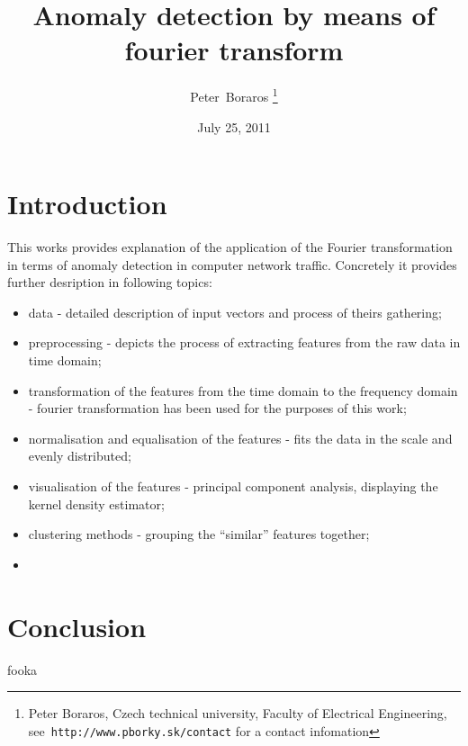 \documentclass[a4paper]{IEEEtran}
\begin{document}
\title{Anomaly detection by means of fourier transform}
\date{July 25, 2011}
\author{Peter~Boraros %
\thanks{{Peter Boraros}, Czech technical university, Faculty of Electrical Engineering,
see~\texttt{http://www.pborky.sk/contact} for a contact infomation}}%



\maketitle
\IEEEdisplaynotcompsoctitleabstractindextext
\IEEEpeerreviewmaketitle

\section{Introduction}
This works provides explanation of the application of the Fourier transformation in terms of anomaly detection in computer network traffic.
Concretely it provides further desription in following topics:
\begin{itemize}
	\item data - detailed description of input vectors and process of theirs gathering;
	\item preprocessing - depicts the process of extracting features from the raw data in time domain;
	\item transformation of the features from the time domain to the frequency domain - fourier transformation has been used for the purposes of this work;
	\item normalisation and equalisation of the features - fits the data in the scale and evenly distributed;
	\item visualisation of the features - principal component analysis, displaying the kernel density estimator;
	\item clustering methods - grouping the ``similar'' features together;
	\item 
\end{itemize}

\section{Conclusion}
fooka
\end{document}

